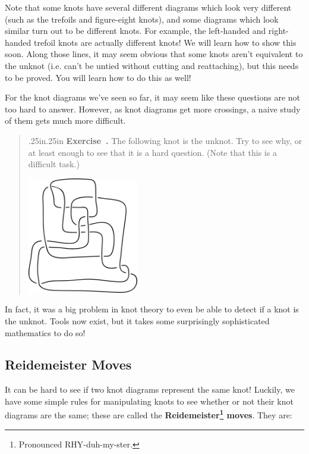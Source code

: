 \documentclass[12 pt]{article}
\newcounter{exercise}[section]
\newenvironment{exercise}{\refstepcounter{exercise}\par\bigskip \begin{quotation}{}{\leftmargin .25in\rightmargin .25in}
	\noindent \textbf{Exercise~\thesection.\theexercise }  \rmfamily}{\end{quotation}\par\bigskip}
\begin{document}
Note that some knots have several different diagrams which look very different (such as the trefoils and figure-eight knots), and some diagrams which look similar turn out to be different knots. For example, the left-handed and right-handed trefoil knots are actually different knots! We will learn how to show this soon. Along those lines, it may seem obvious that some knots aren't equivalent to the unknot (i.e. can't be untied without cutting and reattaching), but this needs to be proved. You will learn how to do this as well!

For the knot diagrams we've seen so far, it may seem like these questions are not too hard to answer. However, as knot diagrams get more crossings, a naive study of them gets much more difficult.

\begin{exercise}
The following knot is the unknot. Try to see why, or at least enough to see that it is a hard question. (Note that this is a difficult task.)
\vspace{.2in}
\begin{center}
\includegraphics[height = 2in]{tricky_unknot.png}
\end{center}
\end{exercise}

In fact, it was a big problem in knot theory to even be able to detect if a knot is the unknot. Tools now exist, but it takes some surprisingly sophisticated mathematics to do so!

\subsection{Reidemeister Moves}

It can be hard to see if two knot diagrams represent the same knot! Luckily, we have some simple rules for manipulating knots to see whether or not their knot diagrams are the same; these are called the \textbf{Reidemeister\footnote{Pronounced RHY-duh-my-ster.} moves}. They are:
\end{document}
